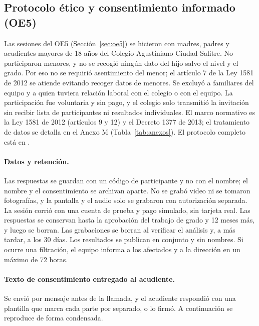 \subsection{Protocolo ético y consentimiento informado (OE5)}
\label{anx:etica}
Las sesiones del OE5 (Sección~\ref{sec:oe5}) se hicieron con madres, padres y acudientes mayores de 18 años del Colegio Agustiniano Ciudad Salitre. No participaron menores, y no se recogió ningún dato del hijo salvo el nivel y el grado. Por eso no se requirió asentimiento del menor; el artículo 7 de la Ley 1581 de 2012 se atiende evitando recoger datos de menores. Se excluyó a familiares del equipo y a quien tuviera relación laboral con el colegio o con el equipo. La participación fue voluntaria y sin pago, y el colegio solo transmitió la invitación sin recibir lista de participantes ni resultados individuales. El marco normativo es la Ley 1581 de 2012 (artículos 9 y 12) y el Decreto 1377 de 2013; el tratamiento de datos se detalla en el Anexo M (Tabla~\ref{tab:anexos}). El protocolo completo está en .

\paragraph{Datos y retención.} Las respuestas se guardan con un código de participante y no con el nombre; el nombre y el consentimiento se archivan aparte. No se grabó video ni se tomaron fotografías, y la pantalla y el audio solo se grabaron con autorización separada. La sesión corrió con una cuenta de prueba y pago simulado, sin tarjeta real. Las respuestas se conservan hasta la aprobación del trabajo de grado y 12 meses más, y luego se borran. Las grabaciones se borran al verificar el análisis y, a más tardar, a los 30 días. Los resultados se publican en conjunto y sin nombres. Si ocurre una filtración, el equipo informa a los afectados y a la dirección en un máximo de 72 horas.

\paragraph{Texto de consentimiento entregado al acudiente.}
Se envió por mensaje antes de la llamada, y el acudiente respondió con una plantilla que marca cada parte por separado, o lo firmó. A continuación se reproduce de forma condensada.

